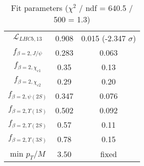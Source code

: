 \begin{table}[h!]
\begin{tabular}{c|c|c}
$\mathcal L_{LHCb,13}$ & 0.908 & 0.015 (-2.347 $\sigma$) \\
$f_{\beta=2,J/\psi}$ & 0.283 & 0.063 \\
$f_{\beta=2,\chi_{c1}}$ & 0.35 & 0.13 \\
$f_{\beta=2,\chi_{c2}}$ & 0.29 & 0.20 \\
$f_{\beta=2,\psi(2S)}$ & 0.347 & 0.076 \\
$f_{\beta=2,\Upsilon(1S)}$ & 0.502 & 0.092 \\
$f_{\beta=2,\Upsilon(2S)}$ & 0.57 & 0.11 \\
$f_{\beta=2,\Upsilon(3S)}$ & 0.78 & 0.15 \\
min $p_T/M$ & 3.50 & fixed \\
\end{tabular}
\caption{Fit parameters ($\chi^2$ / ndf = 640.5 / 500 = 1.3)}
\end{table}
